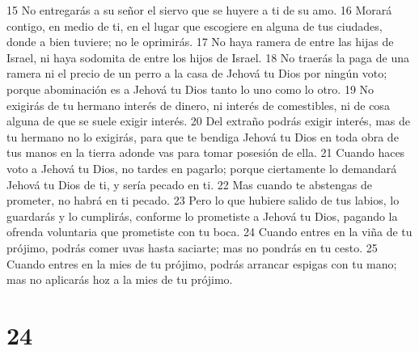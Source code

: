 15 No entregarás a su señor el siervo que se huyere a ti de su amo.
16 Morará contigo, en medio de ti, en el lugar que escogiere en alguna de tus ciudades, donde a bien tuviere; no le oprimirás.
17 No haya ramera de entre las hijas de Israel, ni haya sodomita de entre los hijos de Israel.
18 No traerás la paga de una ramera ni el precio de un perro a la casa de Jehová tu Dios por ningún voto; porque abominación es a Jehová tu Dios tanto lo uno como lo otro.
19 No exigirás de tu hermano interés de dinero, ni interés de comestibles, ni de cosa alguna de que se suele exigir interés.
20 Del extraño podrás exigir interés, mas de tu hermano no lo exigirás, para que te bendiga Jehová tu Dios en toda obra de tus manos en la tierra adonde vas para tomar posesión de ella. 
21 Cuando haces voto a Jehová tu Dios, no tardes en pagarlo; porque ciertamente lo demandará Jehová tu Dios de ti, y sería pecado en ti.
22 Mas cuando te abstengas de prometer, no habrá en ti pecado. 
23 Pero lo que hubiere salido de tus labios, lo guardarás y lo cumplirás, conforme lo prometiste a Jehová tu Dios, pagando la ofrenda voluntaria que prometiste con tu boca.
24 Cuando entres en la viña de tu prójimo, podrás comer uvas hasta saciarte; mas no pondrás en tu cesto.
25 Cuando entres en la mies de tu prójimo, podrás arrancar espigas con tu mano; mas no aplicarás hoz a la mies de tu prójimo. 

\chapter{24}


